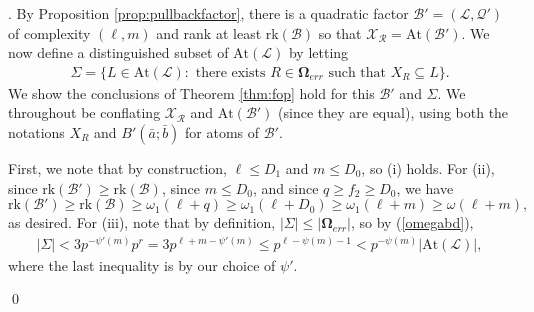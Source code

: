 \documentclass[12pt,oneside,british,a4wide]{amsart}
\numberwithin{equation}{section}
\theoremstyle{definition}
\newcommand{\abar}{\bar{a}}
\newcommand{\bbar}{\bar{b}}
\newcommand{\calL}{\mathcal{L}}
\newcommand{\calB}{\mathcal{B}}
\newcommand{\calQ}{\mathcal{Q}}
\newcommand{\calR}{\mathcal{R}}
\newcommand{\calX}{\mathcal{X}}
\newcommand{\At}{{\mathrm{At}}}
\newcommand{\rk}{{\mathrm{rk}}}
\newenvironment{proofof}[1]{\indent{\itshape Proof of #1}.\;}{\qed}
\begin{document}
\begin{proofof}{Theorem \ref{thm:fop}}
 By Proposition \ref{prop:pullbackfactor}, there is a quadratic factor $\calB'=(\calL,\calQ')$ of complexity $(\ell,m)$ and rank at least $\rk(\calB)$ so that $\calX_{\calR}=\At(\calB')$.  We now define a distinguished subset of $\At(\calL)$ by letting  
\begin{align*}
\Sigma=\{L\in \At(\calL): \text{ there exists }R\in \mathbf{\Omega}_{err}\text{ such that }X_R\subseteq L\}.
\end{align*}
We show the conclusions of Theorem \ref{thm:fop} hold for this $\calB'$ and $\Sigma$.     We throughout be conflating $\calX_{\calR}$ and $\At(\calB')$ (since they are equal),  using both the notations $X_R$ and $B'(\abar;\bbar)$ for atoms of $\calB'$.
 
 First, we note that by construction, $\ell\leq D_1$ and $m\leq D_0$, so (i) holds.  For (ii), since $\rk(\calB')\geq \rk(\calB)$,  since $m\leq D_0$, and since $q\geq f_2 \geq D_0$, we have
 $$
 \rk(\calB')\geq \rk(\calB)\geq \omega_1(\ell+q)\geq \omega_1(\ell+D_0)\geq \omega_1(\ell+m)\geq \omega(\ell+m),
 $$
as desired.  For (iii), note that by definition,  $|\Sigma|\leq |\mathbf{\Omega}_{err}|$, so by (\ref{omegabd}),
 \begin{align}\label{sigmabound}
|\Sigma|<3p^{-\psi'(m)}p^r=3p^{\ell+m-\psi'(m)}\leq p^{\ell-\psi(m)-1}<p^{-\psi(m)}|\At(\calL)|,
\end{align}
where the last inequality is by our choice of $\psi'$.


\end{proofof}
\end{document}
